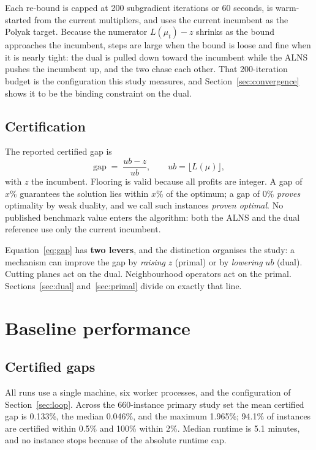 \documentclass[11pt,a4paper]{article}
\begin{document}
Each re-bound is capped at 200 subgradient iterations or 60 seconds, is
warm-started from the current multipliers, and uses the current incumbent as the
Polyak target. Because the numerator $L(\mu_t)-z$ shrinks as the bound approaches
the incumbent, steps are large when the bound is loose and fine when it is nearly
tight: the dual is pulled down toward the incumbent while the ALNS pushes the
incumbent up, and the two chase each other. That 200-iteration budget is the
configuration this study measures, and Section~\ref{sec:convergence} shows it to
be the binding constraint on the dual.

\subsection{Certification}\label{sec:certification}

The reported certified gap is
\begin{equation}\label{eq:gap}
\text{gap} \;=\; \frac{ub-z}{ub},\qquad ub=\lfloor L(\mu)\rfloor ,
\end{equation}
with $z$ the incumbent. Flooring is valid because all profits are integer. A gap
of $x\%$ guarantees the solution lies within $x\%$ of the optimum; a gap of $0\%$
\emph{proves} optimality by weak duality, and we call such instances \emph{proven
optimal}. No published benchmark value enters the algorithm: both the ALNS and the
dual reference use only the current incumbent.

Equation~\eqref{eq:gap} has \textbf{two levers}, and the distinction organises the
study: a mechanism can improve the gap by \emph{raising} $z$ (primal) or by
\emph{lowering} $ub$ (dual). Cutting planes act on the dual. Neighbourhood
operators act on the primal. Sections~\ref{sec:dual} and~\ref{sec:primal} divide
on exactly that line.

\section{Baseline performance}\label{sec:baseline}

\subsection{Certified gaps}

All runs use a single machine, six worker processes, and the configuration of
Section~\ref{sec:loop}. Across the 660-instance primary study set the mean
certified gap is 0.133\%, the median 0.046\%, and the maximum 1.965\%; 94.1\% of
instances are certified within 0.5\% and 100\% within 2\%. Median runtime is 5.1
minutes, and no instance stops because of the absolute runtime cap.
\end{document}
